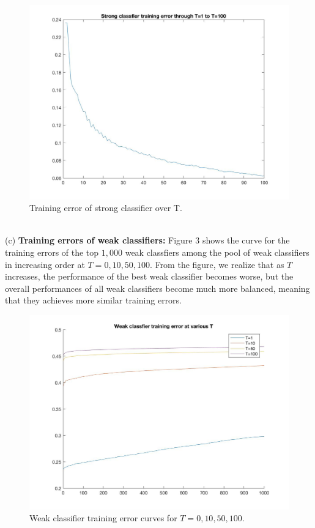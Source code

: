 \documentclass[10pt]{article}
\begin{document}
	\begin{figure}[ht]
		\includegraphics[scale = 0.25]{strong_classifier_training_error.jpg}
		\centering
		\caption{Training error of strong classifier over T.}
		\label{2}
	\end{figure}\\
	(c) \textbf{Training errors of weak classifiers:} Figure 3 shows the curve for the training errors of the top $1,000$ weak classfiers among the pool of weak classifiers in increasing order at $T=0,10,50,100$. From the figure, we realize that as $T$ increases, the performance of the best weak classifier becomes worse, but the overall performances of all weak classifiers become much more balanced, meaning that they achieves more similar training errors.\\
	\begin{figure}[ht]
		\includegraphics[scale = 0.25]{top_1000_weak_classifiers.jpg}
		\centering
		\caption{Weak classifier training error curves for $T=0,10,50,100$.}
		\label{3}
	\end{figure}\\
\end{document}
